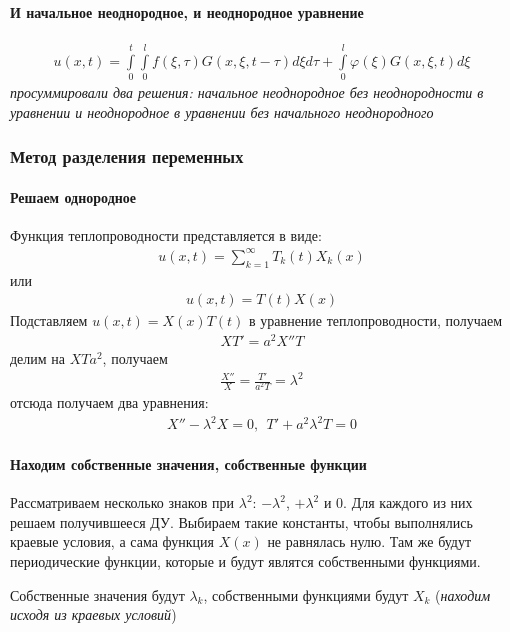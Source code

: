 \documentclass{article}[12pt]
\begin{document}
\paragraph{И начальное неоднородное, и неоднородное уравнение}
\begin{eqnarray*}
    u(x,t)=\int\limits_{0}^{t}\int\limits_{0}^{l}
    f(\xi,\tau)G(x,\xi,t-\tau)d\xi d\tau
    +\int\limits_{0}^{l}\varphi(\xi)G(x,\xi,t)d\xi
\end{eqnarray*}
\textit{просуммировали два решения: начальное неоднородное без
неоднородности в уравнении и неоднородное в уравнении без начального
неоднородного}



\subsubsection{Метод разделения переменных}
\paragraph{Решаем однородное}
Функция теплопроводности представляется в виде:
\begin{eqnarray*}
    u(x,t)=\sum\limits_{k=1}^{\infty}T_{k}(t)X_{k}(x)
\end{eqnarray*}
или
\begin{eqnarray*}
    u(x,t)=T(t)X(x)
\end{eqnarray*}
Подставляем $u(x,t)=X(x)T(t)$ в уравнение теплопроводности, получаем
\begin{eqnarray*}
    XT'=a^{2}X''T
\end{eqnarray*}
делим на $XTa^{2}$, получаем
\begin{eqnarray*}
    \frac{X''}{X}=\frac{T'}{a^{2}T}=\lambda^{2}
\end{eqnarray*}
отсюда получаем два уравнения:
\begin{eqnarray*}
    X''-\lambda^{2}X=0,\ \ T'+a^{2}\lambda^{2}T=0
\end{eqnarray*}

\paragraph{Находим собственные значения, собственные функции}
Рассматриваем несколько знаков при $\lambda^{2}$: $-\lambda^{2}$,
$+\lambda^{2}$ и $0$. Для каждого из них решаем получившееся ДУ.
Выбираем такие константы, чтобы выполнялись краевые условия, а сама
функция $X(x)$ не равнялась нулю. Там же будут периодические функции,
которые и будут являтся собственными функциями.
\par Собственные значения будут $\lambda_{k}$, собственными функциями будут
$X_{k}$ (\textit{находим исходя из краевых условий})
\end{document}
